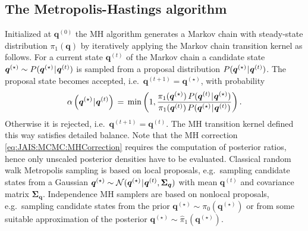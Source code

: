 \subsection{The Metropolis-Hastings algorithm} \label{sec:JAIS:Computation:MH}
Initialized at \(\bm{q}^{(0)}\) the MH algorithm generates a Markov chain with steady-state distribution \(\pi_1(\bm{q})\) by iteratively applying the Markov chain transition kernel as follows.
For a current state \(\bm{q}^{(t)}\) of the Markov chain a candidate state \(\bm{q}^{(\star)} \sim P(\bm{q}^{(\star)} {\:\!}|{\:\!} \bm{q}^{(t)})\)
is sampled from a proposal distribution \(P(\bm{q}^{(\star)} {\:\!}|{\:\!} \bm{q}^{(t)})\).
The proposal state becomes accepted, i.e.\ \(\bm{q}^{(t+1)} = \bm{q}^{(\star)}\), with probability
\begin{equation} \label{eq:JAIS:MCMC:MHCorrection}
  \alpha \left( \bm{q}^{(\star)} {\:\!}|{\:\!} \bm{q}^{(t)} \right)
  \, = \, \mathrm{min} \left( 1,\frac{\pi_1(\bm{q}^{(\star)}) \, P(\bm{q}^{(t)} {\:\!}|{\:\!} \bm{q}^{(\star)})}{\pi_1(\bm{q}^{(t)}) \, P(\bm{q}^{(\star)} {\:\!}|{\:\!} \bm{q}^{(t)})} \right).
\end{equation}
Otherwise it is rejected, i.e.\ \(\bm{q}^{(t+1)} = \bm{q}^{(t)}\).
The MH transition kernel defined this way satisfies detailed balance.
Note that the MH correction \cref{eq:JAIS:MCMC:MHCorrection} requires the computation of posterior ratios, hence only unscaled posterior densities have to be evaluated.
Classical random walk Metropolis sampling is based on local proposals, e.g.\ sampling candidate states from a Gaussian
\(\bm{q}^{(\star)} \sim \mathcal{N}(\bm{q}^{(\star)} {\:\!}|{\:\!} \bm{q}^{(t)},\bm{\Sigma}_{\bm{q}})\) with mean \(\bm{q}^{(t)}\) and covariance matrix \(\bm{\Sigma}_{\bm{q}}\).
Independence MH samplers are based on nonlocal proposals, e.g.\ sampling candidate states from the prior \(\bm{q}^{(\star)} \sim \pi_0(\bm{q}^{(\star)})\)
or from some suitable approximation of the posterior \(\bm{q}^{(\star)} \sim \hat{\pi}_1(\bm{q}^{(\star)})\).

